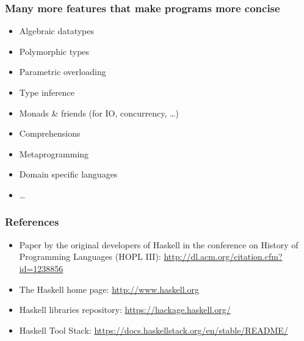 \documentclass{beamer}
\begin{document}
\begin{frame}
  \frametitle{Many more features that make programs more concise}
  \begin{itemize}
  \item Algebraic datatypes
  \item Polymorphic types
  \item Parametric overloading
  \item Type inference
  \item Monads \& friends (for IO, concurrency, \dots)
  \item Comprehensions
  \item Metaprogramming
  \item Domain specific languages
  \item \dots
  \end{itemize}
\end{frame}
\begin{frame}
  \frametitle{References}
  \begin{itemize}
  \item Paper by the original developers of Haskell in the conference on History of
    Programming Languages (HOPL III): \href{A History
      of Haskell: Being Lazy with
      Class}{http://dl.acm.org/citation.cfm?id=1238856}
  \item The Haskell home page: \url{http://www.haskell.org}
  \item Haskell libraries repository:
    \url{https://hackage.haskell.org/}
  \item Haskell Tool Stack: \url{https://docs.haskellstack.org/en/stable/README/}
  \end{itemize}
\end{frame}


\begin{frame}
  \begin{center}
  \end{center}
\end{frame}
\end{document}
